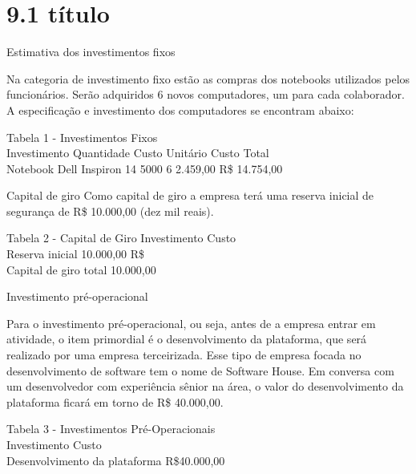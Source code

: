 \section{\textbf{9.1 título}}
\label{sec: 9.1 Sub título}

Estimativa dos investimentos fixos\par
Na categoria de investimento fixo estão as compras dos notebooks utilizados 
pelos funcionários. Serão adquiridos 6 novos computadores, um para cada
colaborador. A especificação e investimento dos computadores se encontram abaixo:\par

\begin{commentB}
	Tabela 1 - Investimentos Fixos\\
	Investimento Quantidade Custo Unitário Custo Total\\
	Notebook Dell Inspiron 14 5000 6 2.459,00 R\$ 14.754,00
	\par \end{commentB}


Capital de giro 
Como capital de giro a empresa terá uma reserva inicial de segurança de R\$ 
10.000,00 (dez mil reais). \par

\begin{commentB}
	Tabela 2 - Capital de Giro
	Investimento Custo\\
	Reserva inicial 10.000,00 R\$ \\
	Capital de giro total 10.000,00
	\par \end{commentB}


Investimento pré-operacional \par
Para o investimento pré-operacional, ou seja, antes de a empresa entrar em 
atividade, o item primordial é o desenvolvimento da plataforma, que será realizado por 
uma empresa terceirizada. Esse tipo de empresa focada no desenvolvimento de 
software tem o nome de Software House. Em conversa com um desenvolvedor com 
experiência sênior na área, o valor do desenvolvimento da plataforma ficará em torno 
de R\$ 40.000,00. \par

\begin{commentB}
	Tabela 3 - Investimentos Pré-Operacionais\\
	Investimento Custo\\
	Desenvolvimento da plataforma R\$40.000,00
	\par \end{commentB}


